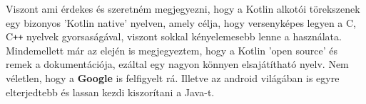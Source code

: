 Viszont ami érdekes és szeretném megjegyezni, hogy a Kotlin alkotói törekszenek egy bizonyos 'Kotlin native' nyelven, amely célja, hogy versenyképes legyen a C, C\verb|++| nyelvek gyorsaságával, viszont sokkal kényelemesebb lenne a használata. Mindemellett már az elején is megjegyeztem, hogy a Kotlin 'open source' és remek a dokumentációja, ezáltal egy nagyon könnyen elsajátítható nyelv. Nem véletlen, hogy a \textbf{Google} is felfigyelt rá. Illetve az android világában is egyre elterjedtebb és lassan kezdi kiszorítani a Java-t.